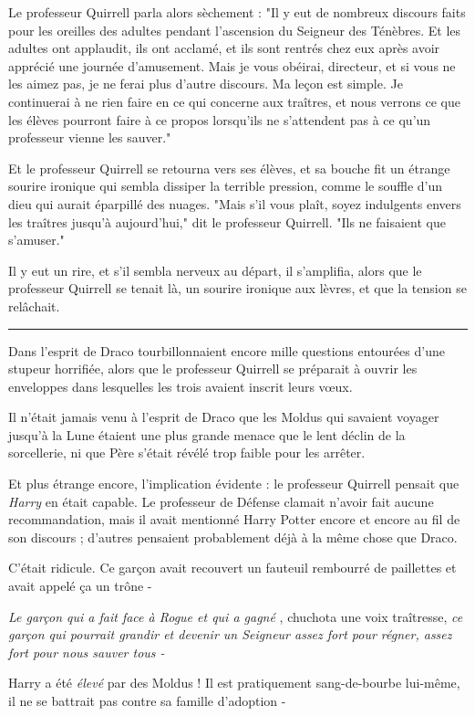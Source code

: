 Le professeur Quirrell parla alors sèchement : "Il y eut de nombreux discours faits pour les oreilles des adultes pendant l'ascension du Seigneur des Ténèbres. Et les adultes ont applaudit, ils ont acclamé, et ils sont rentrés chez eux après avoir apprécié une journée d'amusement. Mais je vous obéirai, directeur, et si vous ne les aimez pas, je ne ferai plus d'autre discours. Ma leçon est simple. Je continuerai à ne rien faire en ce qui concerne aux traîtres, et nous verrons ce que les élèves pourront faire à ce propos lorsqu'ils ne s'attendent pas à ce qu'un professeur vienne les sauver."

Et le professeur Quirrell se retourna vers ses élèves, et sa bouche fit un étrange sourire ironique qui sembla dissiper la terrible pression, comme le souffle d'un dieu qui aurait éparpillé des nuages. "Mais s'il vous plaît, soyez indulgents envers les traîtres jusqu'à aujourd'hui," dit le professeur Quirrell. "Ils ne faisaient que s'amuser."

Il y eut un rire, et s'il sembla nerveux au départ, il s'amplifia, alors que le professeur Quirrell se tenait là, un sourire ironique aux lèvres, et que la tension se relâchait.
\par\noindent\rule{\textwidth}{0.4pt}
Dans l'esprit de Draco tourbillonnaient encore mille questions entourées d'une stupeur horrifiée, alors que le professeur Quirrell se préparait à ouvrir les enveloppes dans lesquelles les trois avaient inscrit leurs vœux.

Il n'était jamais venu à l'esprit de Draco que les Moldus qui savaient voyager jusqu'à la Lune étaient une plus grande menace que le lent déclin de la sorcellerie, ni que Père s'était révélé trop faible pour les arrêter.

Et plus étrange encore, l'implication évidente : le professeur Quirrell pensait que \emph{Harry}  en était capable. Le professeur de Défense clamait n'avoir fait aucune recommandation, mais il avait mentionné Harry Potter encore et encore au fil de son discours ; d'autres pensaient probablement déjà à la même chose que Draco.

C'était ridicule. Ce garçon avait recouvert un fauteuil rembourré de paillettes et avait appelé ça un trône -

\emph{Le garçon qui a fait face à Rogue et qui a gagné} , chuchota une voix traîtresse, \emph{ce garçon qui pourrait grandir et devenir un Seigneur assez fort pour régner, assez fort pour nous sauver tous -} 

Harry a été \emph{élevé}  par des Moldus ! Il est pratiquement sang-de-bourbe lui-même, il ne se battrait pas contre sa famille d'adoption -

